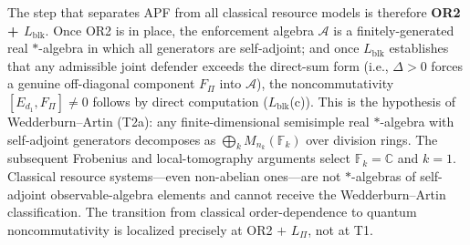 \documentclass[11pt]{article}
\theoremstyle{remark}
\begin{document}
The step that separates APF from all classical resource models is therefore \textbf{OR2 + $L_{\mathrm{blk}}$}.  Once OR2 is in place, the enforcement algebra $\mathcal{A}$ is a finitely-generated real $*$-algebra in which all generators are self-adjoint; and once $L_{\mathrm{blk}}$ establishes that any admissible joint defender exceeds the direct-sum form (i.e., $\Delta > 0$ forces a genuine off-diagonal component $F_\Pi$ into $\mathcal{A}$), the noncommutativity $[E_{d_1}, F_\Pi] \ne 0$ follows by direct computation ($L_{\mathrm{blk}}$(c)).  This is the hypothesis of Wedderburn--Artin (T2a): any finite-dimensional semisimple real $*$-algebra with self-adjoint generators decomposes as $\bigoplus_k M_{n_k}(\mathbb{F}_k)$ over division rings.  The subsequent Frobenius and local-tomography arguments select $\mathbb{F}_k = \mathbb{C}$ and $k = 1$.  Classical resource systems---even non-abelian ones---are not $*$-algebras of self-adjoint observable-algebra elements and cannot receive the Wedderburn--Artin classification.  The transition from classical order-dependence to quantum noncommutativity is localized precisely at OR2 $+$ $L_\Pi$, not at T1.
\end{document}
